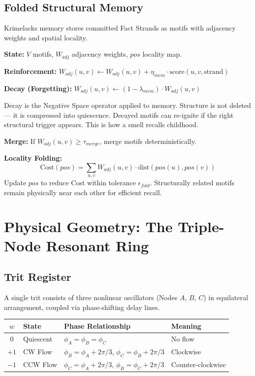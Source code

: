 \documentclass[11pt, a4paper]{report}
\begin{document}
\section{Folded Structural Memory}

Krimelacks memory stores committed Fact Strands as motifs with adjacency
weights and spatial locality.

\textbf{State:} $V$ motifs, $W_{adj}$ adjacency weights, $pos$ locality map.

\textbf{Reinforcement:}
$W_{adj}(u,v) \leftarrow W_{adj}(u,v) + \eta_{mem} \cdot \text{score}(u,v,\text{strand})$

\textbf{Decay (Forgetting):}
$W_{adj}(u,v) \leftarrow (1 - \lambda_{mem}) \cdot W_{adj}(u,v)$

Decay is the Negative Space operator applied to memory. Structure is not
deleted --- it is compressed into quiescence. Decayed motifs can re-ignite
if the right structural trigger appears. This is how a smell recalls
childhood.

\textbf{Merge:}
If $W_{adj}(u,v) \geq \tau_{merge}$, merge motifs deterministically.

\textbf{Locality Folding:}
\begin{equation}
  \text{Cost}(pos) = \sum_{u,v} W_{adj}(u,v) \cdot \text{dist}(pos(u), pos(v))
\end{equation}
Update $pos$ to reduce Cost within tolerance $\epsilon_{fold}$. Structurally
related motifs remain physically near each other for efficient recall.

\chapter{Physical Geometry: The Triple-Node Resonant Ring}

\section{Trit Register}

A single trit consists of three nonlinear oscillators (Nodes $A$, $B$, $C$)
in equilateral arrangement, coupled via phase-shifting delay lines.

\begin{center}
\begin{tabular}{@{}clll@{}}
\toprule
$w$ & State & Phase Relationship & Meaning \\
\midrule
$0$  & Quiescent & $\phi_A = \phi_B = \phi_C$ & No flow \\
$+1$ & CW Flow   & $\phi_B = \phi_A + 2\pi/3$, $\phi_C = \phi_B + 2\pi/3$ & Clockwise \\
$-1$ & CCW Flow  & $\phi_C = \phi_A + 2\pi/3$, $\phi_B = \phi_C + 2\pi/3$ & Counter-clockwise \\
\bottomrule
\end{tabular}
\end{center}
\end{document}
